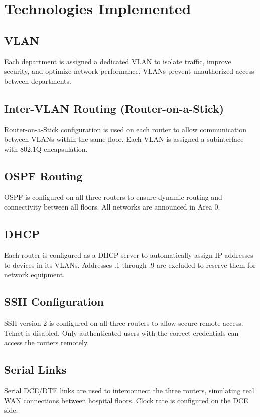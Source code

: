 \documentclass[12pt, a4paper]{article}
\begin{document}
\section{Technologies Implemented}

\subsection{VLAN}
Each department is assigned a dedicated VLAN to isolate traffic, improve security, 
and optimize network performance. VLANs prevent unauthorized access between departments.

\subsection{Inter-VLAN Routing (Router-on-a-Stick)}
Router-on-a-Stick configuration is used on each router to allow communication 
between VLANs within the same floor. Each VLAN is assigned a subinterface with 
802.1Q encapsulation.

\subsection{OSPF Routing}
OSPF is configured on all three routers to ensure dynamic routing and connectivity 
between all floors. All networks are announced in Area 0.

\subsection{DHCP}
Each router is configured as a DHCP server to automatically assign IP addresses 
to devices in its VLANs. Addresses .1 through .9 are excluded to reserve them 
for network equipment.

\subsection{SSH Configuration}
SSH version 2 is configured on all three routers to allow secure remote access. 
Telnet is disabled. Only authenticated users with the correct credentials can 
access the routers remotely.

\subsection{Serial Links}
Serial DCE/DTE links are used to interconnect the three routers, simulating real 
WAN connections between hospital floors. Clock rate is configured on the DCE side.
\end{document}
